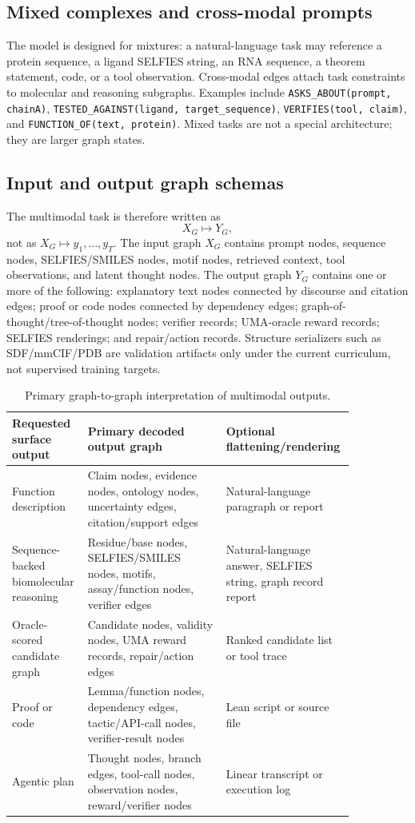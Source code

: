 \documentclass[11pt]{article}
\newcommand{\1}{\mathbf{1}}
\begin{document}
\subsection{Mixed complexes and cross-modal prompts}

The model is designed for mixtures: a natural-language task may reference a protein sequence, a ligand SELFIES string, an RNA sequence, a theorem statement, code, or a tool observation. Cross-modal edges attach task constraints to molecular and reasoning subgraphs. Examples include \texttt{ASKS\_ABOUT(prompt, chainA)}, \texttt{TESTED\_AGAINST(ligand, target\_sequence)}, \texttt{VERIFIES(tool, claim)}, and \texttt{FUNCTION\_OF(text, protein)}. Mixed tasks are not a special architecture; they are larger graph states.

\subsection{Input and output graph schemas}

The multimodal task is therefore written as
\[
  X_G \longmapsto Y_G,
\]
not as \(X_G\longmapsto y_1,\ldots,y_T\). The input graph \(X_G\) contains prompt nodes, sequence nodes, SELFIES/SMILES nodes, motif nodes, retrieved context, tool observations, and latent thought nodes. The output graph \(Y_G\) contains one or more of the following: explanatory text nodes connected by discourse and citation edges; proof or code nodes connected by dependency edges; graph-of-thought/tree-of-thought nodes; verifier records; UMA-oracle reward records; SELFIES renderings; and repair/action records. Structure serializers such as SDF/mmCIF/PDB are validation artifacts only under the current curriculum, not supervised training targets.

\begin{table}[H]
\centering
\caption{Primary graph-to-graph interpretation of multimodal outputs.}
\scriptsize
\setlength{\tabcolsep}{3pt}
\begin{tabular}{p{0.19\linewidth}p{0.39\linewidth}p{0.27\linewidth}}
\toprule
Requested surface output & Primary decoded output graph & Optional flattening/rendering \\
\midrule
Function description & Claim nodes, evidence nodes, ontology nodes, uncertainty edges, citation/support edges & Natural-language paragraph or report \\
Sequence-backed biomolecular reasoning & Residue/base nodes, SELFIES/SMILES nodes, motifs, assay/function nodes, verifier edges & Natural-language answer, SELFIES string, graph record report \\
Oracle-scored candidate graph & Candidate nodes, validity nodes, UMA reward records, repair/action edges & Ranked candidate list or tool trace \\
Proof or code & Lemma/function nodes, dependency edges, tactic/API-call nodes, verifier-result nodes & Lean script or source file \\
Agentic plan & Thought nodes, branch edges, tool-call nodes, observation nodes, reward/verifier nodes & Linear transcript or execution log \\
\bottomrule
\end{tabular}
\end{table}
\end{document}
